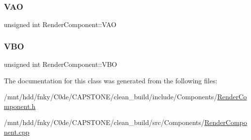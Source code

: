 \subsubsection{\texorpdfstring{V\+AO}{VAO}}
{\footnotesize\ttfamily unsigned int Render\+Component\+::\+V\+AO\hspace{0.3cm}{\ttfamily [private]}}

\mbox{\label{classRenderComponent_a82809c0d1c00bb0bc413cac2b43b9798}} 
\subsubsection{\texorpdfstring{V\+BO}{VBO}}
{\footnotesize\ttfamily unsigned int Render\+Component\+::\+V\+BO\hspace{0.3cm}{\ttfamily [private]}}



The documentation for this class was generated from the following files\+:\begin{DoxyCompactItemize}
\item 
/mnt/hdd/fnky/\+C0de/\+C\+A\+P\+S\+T\+O\+N\+E/clean\+\_\+build/include/\+Components/\hyperlink{RenderComponent_8h}{Render\+Component.\+h}\item 
/mnt/hdd/fnky/\+C0de/\+C\+A\+P\+S\+T\+O\+N\+E/clean\+\_\+build/src/\+Components/\hyperlink{RenderComponent_8cpp}{Render\+Component.\+cpp}\end{DoxyCompactItemize}
